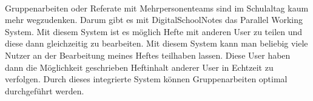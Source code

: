 \\
Gruppenarbeiten oder Referate mit Mehrpersonenteams sind im Schulaltag kaum mehr wegzudenken. Darum gibt es mit DigitalSchoolNotes das Parallel Working System. Mit diesem System ist es möglich Hefte mit anderen User zu teilen und diese dann gleichzeitig zu bearbeiten. Mit diesem System kann man beliebig viele Nutzer an der Bearbeitung meines Heftes teilhaben lassen. Diese User haben dann die Möglichkeit geschrieben Heftinhalt anderer User in Echtzeit zu verfolgen. Durch dieses integrierte System können Gruppenarbeiten optimal durchgeführt werden.\\
